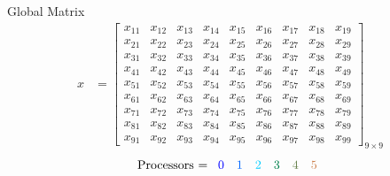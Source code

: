 

\begin{frame}
\begin{block}{Global Matrix}
\begin{align*}
x &= \left[
      \begin{array}{lllllllll}
      x_{11} & x_{12} & x_{13} & x_{14} & x_{15} & x_{16} & x_{17} & x	_{18} & x_{19}\\
      x_{21} & x_{22} & x_{23} & x_{24} & x_{25} & x_{26} & x_{27} & x	_{28} & x_{29}\\
      x_{31} & x_{32} & x_{33} & x_{34} & x_{35} & x_{36} & x_{37} & x	_{38} & x_{39}\\
      x_{41} & x_{42} & x_{43} & x_{44} & x_{45} & x_{46} & x_{47} & x	_{48} & x_{49}\\
      x_{51} & x_{52} & x_{53} & x_{54} & x_{55} & x_{56} & x_{57} & x	_{58} & x_{59}\\
      x_{61} & x_{62} & x_{63} & x_{64} & x_{65} & x_{66} & x_{67} & x	_{68} & x_{69}\\
      x_{71} & x_{72} & x_{73} & x_{74} & x_{75} & x_{76} & x_{77} & x	_{78} & x_{79}\\
      x_{81} & x_{82} & x_{83} & x_{84} & x_{85} & x_{86} & x_{87} & x	_{88} & x_{89}\\
      x_{91} & x_{92} & x_{93} & x_{94} & x_{95} & x_{96} & x_{97} & x	_{98} & x_{99}
      \end{array}
\right]_{9\times 9}
\end{align*}
\begin{align*}
\text{Processors = }
      \begin{array}{llllll}
      \color{g11}0 & \color{g12}1 & \color{g13}2 & \color{g21}3 & \color{g22}4 & \color{g23}5
      \end{array}
\end{align*}
\end{block}
\end{frame}


